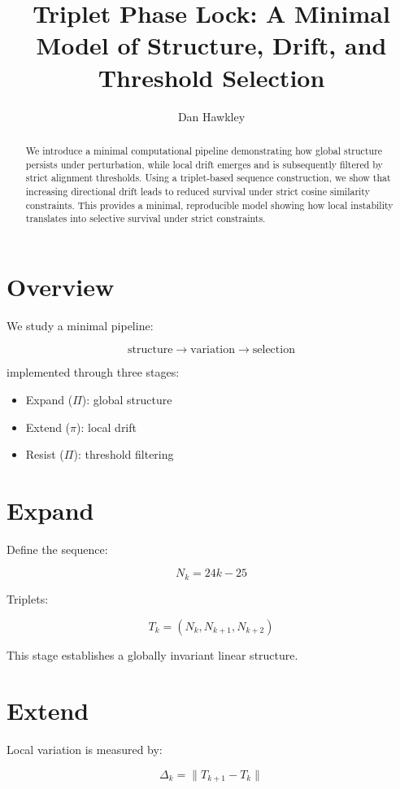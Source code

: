 \documentclass[11pt]{article}
\title{Triplet Phase Lock: A Minimal Model of Structure, Drift, and Threshold Selection}
\author{Dan Hawkley}
\date{}
\begin{document}
\maketitle

\begin{abstract}
We introduce a minimal computational pipeline demonstrating how global structure persists under perturbation, while local drift emerges and is subsequently filtered by strict alignment thresholds. Using a triplet-based sequence construction, we show that increasing directional drift leads to reduced survival under strict cosine similarity constraints. This provides a minimal, reproducible model showing how local instability translates into selective survival under strict constraints.
\end{abstract}

\section{Overview}

We study a minimal pipeline:

\[
\text{structure} \rightarrow \text{variation} \rightarrow \text{selection}
\]

implemented through three stages:

\begin{itemize}
\item Expand ($\Pi$): global structure
\item Extend ($\pi$): local drift
\item Resist ($\Pi$): threshold filtering
\end{itemize}

\section{Expand}

Define the sequence:

\[
N_k = 24k - 25
\]

Triplets:

\[
T_k = (N_k, N_{k+1}, N_{k+2})
\]

This stage establishes a globally invariant linear structure.

\section{Extend}

Local variation is measured by:

\[
\Delta_k = \|T_{k+1} - T_k\|
\]
\end{document}
